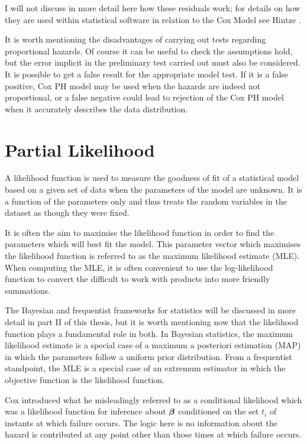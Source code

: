 I will not discuss in more detail here how these residuals work; for details on how they are used within statistical software in relation to the Cox Model see Hintze .

It is worth mentioning the disadvantages of carrying out tests regarding proportional hazards. Of course it can be useful to check the assumptions hold, but the error implicit in the preliminary test carried out must also be considered. It is possible to get a false result for the appropriate model test. If it is a false positive, Cox PH model may be used when the hazards are indeed not proportional, or a false negative could lead to rejection of the Cox PH model when it accurately describes the data distribution.

\section{Partial Likelihood}\label{sec:partial-likelihood}

A likelihood function is used to measure the goodness of fit of a statistical model based on a given set of data when the parameters of the model are unknown. It is a function of the parameters only and thus treats the random variables in the dataset as though they were fixed.

It is often the aim to maximise the likelihood function in order to find the parameters which will best fit the model. This parameter vector which maximises the likelihood function is referred to as the maximum likelihood estimate (MLE). When computing the MLE, it is often convenient to use the log-likelihood function to convert the difficult to work with products into more friendly summations.

The Bayesian and frequentist frameworks for statistics will be discussed in more detail in part II of this thesis, but it is worth mentioning now that the likelihood function plays a fundamental role in both. In Bayesian statistics, the maximum likelihood estimate is a special case of a maximum a posteriori estimation (MAP) in which the parameters follow a uniform prior distribution. From a frequentist standpoint, the MLE is a special case of an extremum estimator in which the objective function is the likelihood function.

Cox  introduced what he misleadingly referred to as a conditional likelihood which was a likelihood function for inference about $\boldsymbol{\beta}$ conditioned on the set ${t_i}$ of instants at which failure occurs. The logic here is no information about the hazard is contributed at any point other than those times at which failure occurs. 

